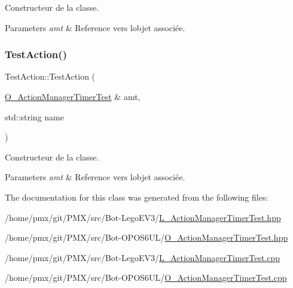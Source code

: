 Constructeur de la classe. 


\begin{DoxyParams}{Parameters}
{\em amt} & Reference vers l\textquotesingle{}objet associée. \\
\hline
\end{DoxyParams}
\mbox{\label{classTestAction_a313c6975b35eb2ec170f843caa32bc6f}} 
\subsubsection{\texorpdfstring{Test\+Action()}{TestAction()}\hspace{0.1cm}{\footnotesize\ttfamily [2/2]}}
{\footnotesize\ttfamily Test\+Action\+::\+Test\+Action (\begin{DoxyParamCaption}\item[{\hyperlink{classO__ActionManagerTimerTest}{O\+\_\+\+Action\+Manager\+Timer\+Test} \&}]{amt,  }\item[{std\+::string}]{name }\end{DoxyParamCaption})}



Constructeur de la classe. 


\begin{DoxyParams}{Parameters}
{\em amt} & Reference vers l\textquotesingle{}objet associée. \\
\hline
\end{DoxyParams}


The documentation for this class was generated from the following files\+:\begin{DoxyCompactItemize}
\item 
/home/pmx/git/\+P\+M\+X/src/\+Bot-\/\+Lego\+E\+V3/\hyperlink{L__ActionManagerTimerTest_8hpp}{L\+\_\+\+Action\+Manager\+Timer\+Test.\+hpp}\item 
/home/pmx/git/\+P\+M\+X/src/\+Bot-\/\+O\+P\+O\+S6\+U\+L/\hyperlink{O__ActionManagerTimerTest_8hpp}{O\+\_\+\+Action\+Manager\+Timer\+Test.\+hpp}\item 
/home/pmx/git/\+P\+M\+X/src/\+Bot-\/\+Lego\+E\+V3/\hyperlink{L__ActionManagerTimerTest_8cpp}{L\+\_\+\+Action\+Manager\+Timer\+Test.\+cpp}\item 
/home/pmx/git/\+P\+M\+X/src/\+Bot-\/\+O\+P\+O\+S6\+U\+L/\hyperlink{O__ActionManagerTimerTest_8cpp}{O\+\_\+\+Action\+Manager\+Timer\+Test.\+cpp}\end{DoxyCompactItemize}
